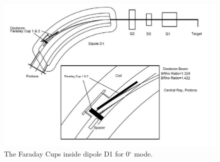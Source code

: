 \begin{figure}[tpb]
  \begin{center}
    \centerline{\includegraphics[scale=0.6]{graph/ch3/FC}}
    \caption{The Faraday Cups inside dipole D1 for 0$^\circ$ mode.}
    \label{fig:GR_FC}
  \end{center}
\end{figure}


%
